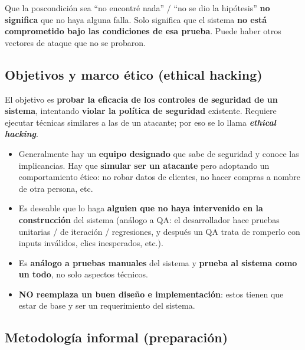\documentclass[../main.tex]{subfiles}
\begin{document}
\begin{ojo}
Que la poscondición sea ``no encontré nada'' / ``no se dio la hipótesis'' \textbf{no
significa} que no haya alguna falla. Solo significa que el sistema \textbf{no está
comprometido bajo las condiciones de esa prueba}. Puede haber otros vectores de ataque
que no se probaron.
\end{ojo}

\subsection{Objetivos y marco ético (ethical hacking)}

El objetivo es \textbf{probar la eficacia de los controles de seguridad de un sistema},
intentando \textbf{violar la política de seguridad} existente. Requiere ejecutar técnicas
similares a las de un atacante; por eso se lo llama \textbf{\emph{ethical hacking}}.

\begin{itemize}
    \item Generalmente hay un \textbf{equipo designado} que sabe de seguridad y conoce las
    implicancias. Hay que \textbf{simular ser un atacante} pero adoptando un comportamiento
    ético: no robar datos de clientes, no hacer compras a nombre de otra persona, etc.
    \item Es deseable que lo haga \textbf{alguien que no haya intervenido en la construcción}
    del sistema (análogo a QA: el desarrollador hace pruebas unitarias / de iteración /
    regresiones, y después un QA trata de romperlo con inputs inválidos, clics inesperados,
    etc.).
    \item Es \textbf{análogo a pruebas manuales} del sistema y \textbf{prueba al sistema como
    un todo}, no solo aspectos técnicos.
    \item \textbf{NO reemplaza un buen diseño e implementación}: estos tienen que estar de
    base y ser un requerimiento del sistema.
\end{itemize}

\subsection{Metodología informal (preparación)}
\end{document}
